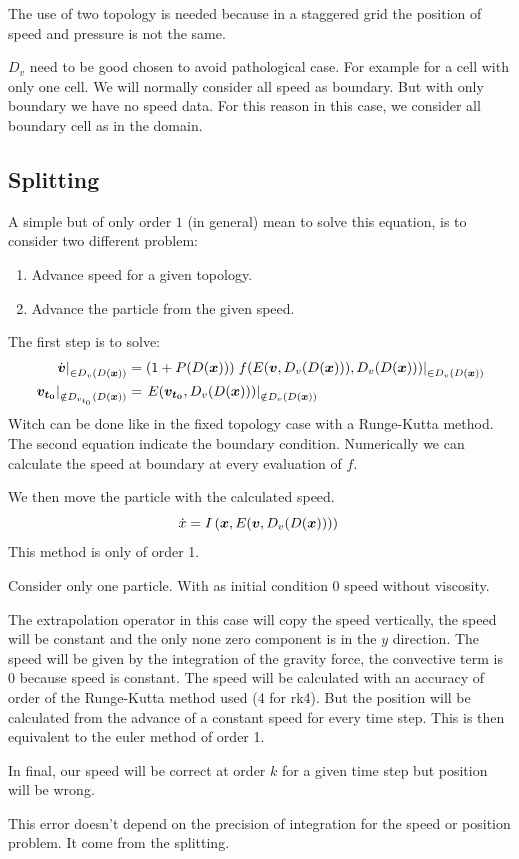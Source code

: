 The use of two topology is needed because in a staggered grid the position of speed and pressure is not the same.

\begin{remark}
$D_{v}$ need to be good chosen to avoid pathological case.
For example for a cell with only one cell. We will normally consider all speed as boundary. But with only boundary we have no speed data.
For this reason in this case, we consider all boundary cell as in the domain.
\end{remark}


\subsection{Splitting}
\label{splitting}

A simple but of only order $1$ (in general) mean to solve this equation, is to consider two different problem:
\begin{enumerate}
	\item Advance speed for a given topology.
	\item Advance the particle from the given speed.
\end{enumerate}
The first step is to solve:
\begin{align}
\left.\dot{{\boldsymbol {v}}}\right|_{\in D_{v}(D({\boldsymbol {x}}))}&=\left(1+P(D({\boldsymbol {x}}))\right)\left.f(E({\boldsymbol {v}},D_v(D({\boldsymbol {x}}))),D_{v}(D({\boldsymbol {x}})))\right|_{\in D_{v}(D({\boldsymbol {x}}))}\\
	\left.{\boldsymbol {v_{t_0}}}\right|_{\notin D_{v_{t_0}}(D({\boldsymbol {x}}))}&=\left.E({\boldsymbol {v_{t_0}}},D_v(D({\boldsymbol {x}})))\right|_{\notin D_{v}(D({\boldsymbol {x}}))}
\end{align}
Witch can be done like in the fixed topology case with a Runge-Kutta method. The second equation indicate the boundary condition.
Numerically we can calculate the speed at boundary at every evaluation of $f$.

We then move the particle with the calculated speed.
\begin{equation}
	\dot{x}=I\left({\boldsymbol {x}},E({\boldsymbol {v}},D_v(D({\boldsymbol {x}})))\right)\\
\end{equation}
This method is only of order 1.

\begin{example}
Consider only one particle. With as initial condition 0 speed without viscosity.

The extrapolation operator in this case will copy the speed vertically,
the speed will be constant and the only none zero component is in the $y$ direction.
The speed will be given by the integration of the gravity force, the convective term is 0 because speed is constant.
The speed will be calculated with an accuracy of order of the Runge-Kutta method used (4 for rk4).
But the position will be calculated from the advance of a constant speed for every time step. This is then equivalent to the euler
method of order 1.

In final, our speed will be correct at order $k$ for a given time step but position will be wrong.

This error doesn't depend on the precision of integration for the speed or position problem.
It come from the splitting.
\end{example}

